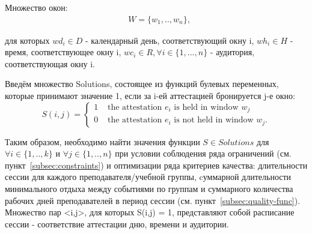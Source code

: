 Множество окон:
\begin{align}
	& W =  \{w_1,..,w_n\}, 
\end{align}

для которых ${wd_i \in D}$ - календарный день, соответствующий окну i, ${wh_i \in H}$ - время, соответствующее окну i, ${wc_i\in{}R , \forall  i \in{} \{1,...,n\}}$ - аудитория, соответствующая окну i.


Введём множество Solutions, состоящее из функций булевых переменных, которые принимают значение 1, если за i-ей аттестацией бронируется j-е окно:
\begin{equation}
	S(i,j) = 
	\begin{cases}
		1 &\text{ the attestation $e_i$ is held in window $w_j$} \\
		0 &\text{ the attestation $e_i$ is not held in window $w_j$}.
	\end{cases}
\end{equation}



Таким образом, необходимо найти значения функции ${S \in Solutions}$ для ${ \forall  i  \in \{1,..,k\}}$  и  ${ \forall j \in \{1,..,n\}}$ при условии соблюдения ряда ограничений (см. пункт~\ref{subsec:constraints}) и оптимизации ряда критериев качества: длительности сессии для каждого преподавателя/учебной группы, cуммарной длительности минимального отдыха между событиями по группам и суммарного количества рабочих дней преподавателей в период сессии (см. пункт~\ref{subsec:quality-func}). Множество пар <i,j>, для которых S(i,j) = 1, представляют собой расписание сессии - соответствие аттестации дню, времени и аудитории.


